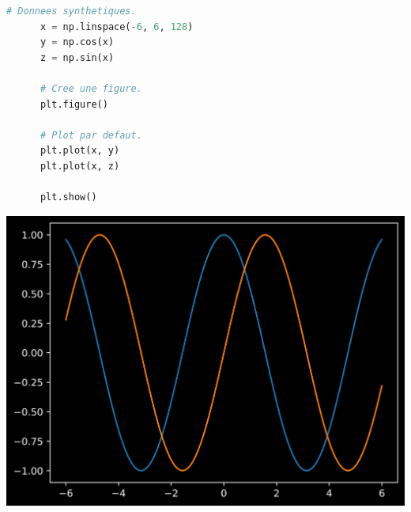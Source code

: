 \documentclass[aspectratio=169]{beamer}
\begin{document}
\begin{frame}[fragile]{}{}
  \vfill
  \begin{minipage}{.48\textwidth}
    \begin{lstlisting}[language=Python]
      # Donnees synthetiques.
      x = np.linspace(-6, 6, 128)
      y = np.cos(x)
      z = np.sin(x)

      # Cree une figure.
      plt.figure()

      # Plot par defaut.
      plt.plot(x, y)
      plt.plot(x, z)

      plt.show()
    \end{lstlisting}
  \end{minipage}%
  \hfill
  \begin{minipage}{.48\textwidth}
    \centering
    \includegraphics[width=\textwidth]{mline_plot_default}
  \end{minipage}
  \vfill
\end{frame}
\end{document}
